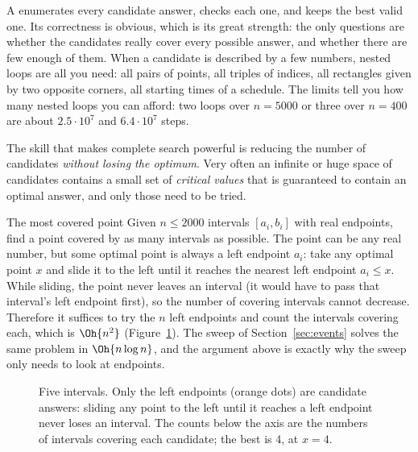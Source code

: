 A  enumerates every candidate answer, checks each one, and keeps the best valid one. Its correctness is
obvious, which is its great strength: the only questions are whether the candidates really cover every possible answer, and
whether there are few enough of them. When a candidate is described by a few numbers, nested loops are all you need: all
pairs of points, all triples of indices, all rectangles given by two opposite corners, all starting times of a schedule. The
limits tell you how many nested loops you can afford: two loops over $n = 5000$ or three over $n = 400$ are about
$2.5\cdot10^7$ and $6.4\cdot10^7$ steps.

The skill that makes complete search powerful is reducing the number of candidates \emph{without losing the optimum}. Very
often an infinite or huge space of candidates contains a small set of \emph{critical values} that is guaranteed to contain an
optimal answer, and only those need to be tried.

\begin{problem}{The most covered point}
Given $n \le 2000$ intervals $[a_i, b_i]$ with real endpoints, find a point covered by as many intervals as possible.
\solution The point can be any real number, but some optimal point is always a left endpoint $a_i$: take any optimal point
$x$ and slide it to the left until it reaches the nearest left endpoint $a_i \le x$. While sliding, the point never leaves an
interval (it would have to pass that interval's left endpoint first), so the number of covering intervals cannot decrease.
Therefore it suffices to try the $n$ left endpoints and count the intervals covering each, which is $\Oh{n^2}$
(Figure~\ref{fig:critical}). The sweep of Section~\ref{sec:events} solves the same problem in $\Oh{n \log n}$, and the
argument above is exactly why the sweep only needs to look at endpoints.
\end{problem}

\begin{figure}[htbp]
\centering
{}
\caption{Five intervals. Only the left endpoints (orange dots) are candidate answers: sliding any point to the left until it
reaches a left endpoint never loses an interval. The counts below the axis are the numbers of intervals covering each
candidate; the best is 4, at $x = 4$.}
\label{fig:critical}
\end{figure}

